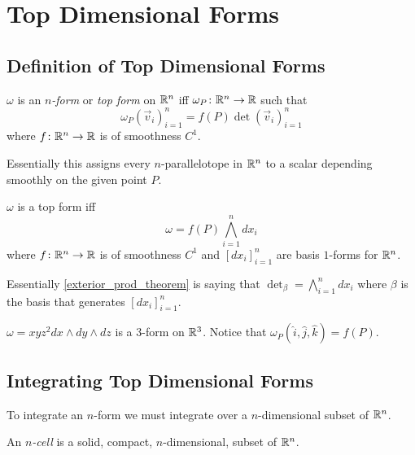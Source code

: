 \documentclass[notes]{subfiles}
\begin{document}
\setcounter{section}{5}
\section{Top Dimensional Forms}
\subsection{Definition of Top Dimensional Forms}

\begin{definition}
    $\omega$ is an \textit{$n$-form} or \textit{top form} on $\mathbb{R}^n$ iff %
    $\omega_P\colon \mathbb{R}^n \to \mathbb{R}$ such that
    \[
        \omega_P(\vec{v}_i)_{i = 1}^n = f(P)\det(\vec{v}_i)_{i = 1}^n
    \]
    where $f\colon \mathbb{R}^n \to \mathbb{R}$ is of smoothness $C^1$.
\end{definition}

Essentially this assigns every $n$-parallelotope in $\mathbb{R}^n$ to a scalar depending smoothly on the given point $P$.

\begin{lemma} \label{exterior_prod_theorem}
    $\omega$ is a top form iff
    \[
        \omega = f(P) \bigwedge_{i = 1}^n dx_i
    \]
    where $f\colon \mathbb{R}^n \to \mathbb{R}$ is of smoothness $C^1$ and $[dx_i]_{i = 1}^n$ are basis $1$-forms for $\mathbb{R}^n$.
\end{lemma}

Essentially \cref{exterior_prod_theorem} is saying that $\det_\beta = \bigwedge_{i = 1}^n dx_i$ where $\beta$ is the basis that generates $[dx_i]_{i = 1}^n$.

\begin{example}
    $\omega = xyz^2 dx \wedge dy \wedge dz$ is a $3$-form on $\mathbb{R}^3$. Notice that $\omega_P(\hat{i}, \hat{j}, \hat{k}) = f(P)$.
\end{example}

\subsection{Integrating Top Dimensional Forms}
To integrate an $n$-form we must integrate over a $n$-dimensional subset of $\mathbb{R}^n$.

\begin{definition}[$n$-Cell]
    An \textit{$n$-cell} is a solid, compact, $n$-dimensional, subset of $\mathbb{R}^n$.
\end{definition}
\end{document}

